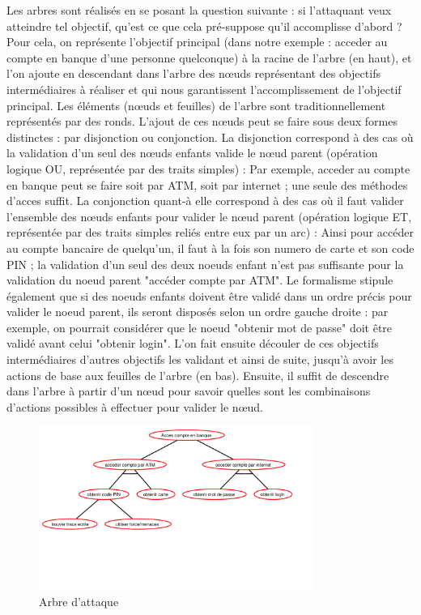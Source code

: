         Les arbres sont réalisés en se posant la question suivante : si l'attaquant veux atteindre tel objectif, qu'est ce que cela pré-suppose qu'il accomplisse d'abord ? Pour cela, on représente l'objectif principal (dans notre exemple : acceder au compte en banque d'une personne quelconque) à la racine de l'arbre (en haut), et l'on ajoute en descendant dans l'arbre des nœuds représentant des objectifs intermédiaires à réaliser et qui nous garantissent l'accomplissement de l'objectif principal. Les éléments (nœuds et feuilles) de l'arbre sont traditionnellement représentés par des ronds. L'ajout de ces nœuds peut se faire sous deux formes distinctes : par disjonction ou conjonction. La disjonction correspond à des cas où la validation d'un seul des nœuds enfants valide le nœud parent (opération logique OU, représentée par des traits simples) : Par exemple, acceder au compte en banque peut se faire soit par ATM, soit par internet ; une seule des méthodes d'acces suffit. La conjonction quant-à elle correspond à des cas où il faut valider l'ensemble des nœuds enfants pour valider le nœud parent (opération logique ET, représentée par des traits simples reliés entre eux par un arc) : Ainsi pour accéder au compte bancaire de quelqu'un, il faut à la fois son numero de carte et son code PIN ; la validation d'un seul des deux noeuds enfant n'est pas suffisante pour la validation du noeud parent "accéder compte par ATM". Le formalisme stipule également que si des noeuds enfants doivent être validé dans un ordre précis pour valider le noeud parent, ils seront disposés selon un ordre gauche droite : par exemple, on pourrait considérer que le noeud "obtenir mot de passe" doit être validé avant celui "obtenir login". L'on fait ensuite découler de ces objectifs intermédiaires d'autres objectifs les validant et ainsi de suite, jusqu'à avoir les actions de base aux feuilles de l'arbre (en bas). Ensuite, il suffit de descendre dans l'arbre à partir d'un nœud pour savoir quelles sont les combinaisons d'actions possibles à effectuer pour valider le nœud.

        \begin{figure}
            \begin{center}
                \includegraphics[width=0.8\textwidth]{figure/exemple1_rapport.pdf}
            \end{center}
            \caption{Arbre d'attaque}
            \label{fig:arbre_exemple_1}
        \end{figure}

